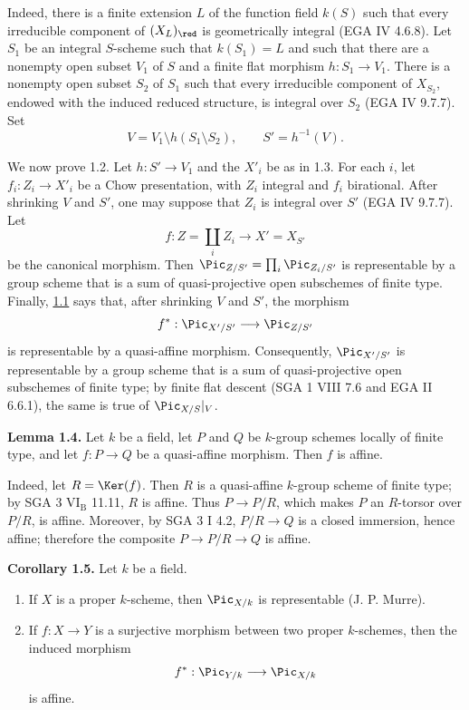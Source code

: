 Indeed, there is a finite extension $L$ of the function field $k(S)$ such
that every irreducible component of $(X_L)_{\red}$ is geometrically integral
(EGA IV 4.6.8). Let $S_1$ be an integral $S$-scheme such that $k(S_1)=L$ and
such that there are a nonempty open subset $V_1$ of $S$ and a finite flat
morphism $h:S_1\to V_1$. There is a nonempty open subset $S_2$ of $S_1$ such
that every irreducible component of $X_{S_2}$, endowed with the induced
reduced structure, is integral over $S_2$ (EGA IV 9.7.7). Set
\[
  V=V_1\setminus h(S_1\setminus S_2),\qquad S'=h^{-1}(V).
\]

We now prove 1.2. Let $h:S'\to V_1$ and the $X'_i$ be as in 1.3. For each
$i$, let $f_i:Z_i\to X'_i$ be a Chow presentation, with $Z_i$ integral and
$f_i$ birational. After shrinking $V$ and $S'$, one may suppose that $Z_i$
is integral over $S'$ (EGA IV 9.7.7). Let
\[
  f:Z=\coprod_i Z_i\longrightarrow X'=X_{S'}
\]
be the canonical morphism. Then
$\Pic_{Z/S'}=\prod_i\Pic_{Z_i/S'}$ is representable by a group scheme that is
a sum of quasi-projective open subschemes of finite type. Finally, \hyperlink{sga6.e12.thm.1-1}{1.1} says
that, after shrinking $V$ and $S'$, the morphism
\[
  f^*:\Pic_{X'/S'}\longrightarrow\Pic_{Z/S'}
\]
is representable by a quasi-affine morphism. Consequently,
$\Pic_{X'/S'}$ is representable by a group scheme that is a sum of
quasi-projective open subschemes of finite type; by finite flat descent
(SGA 1 VIII 7.6 and EGA II 6.6.1), the same is true of
$\Pic_{X/S}|_V$.

\textbf{Lemma 1.4.} Let $k$ be a field, let $P$ and $Q$ be $k$-group schemes
locally of finite type, and let $f:P\to Q$ be a quasi-affine morphism. Then
$f$ is affine.

Indeed, let $R=\Ker(f)$. Then $R$ is a quasi-affine $k$-group scheme of
finite type; by SGA 3 $\mathrm{VI}_{\mathrm B}$ 11.11, $R$ is affine.
Thus $P\to P/R$, which makes $P$ an $R$-torsor over $P/R$, is affine.
Moreover, by SGA 3 I 4.2, $P/R\to Q$ is a closed immersion, hence affine;
therefore the composite $P\to P/R\to Q$ is affine.

\textbf{Corollary 1.5.} Let $k$ be a field.
\begin{enumerate}[label=\alph*)]
\item If $X$ is a proper $k$-scheme, then $\Pic_{X/k}$ is representable
  (J. P. Murre).
\item If $f:X\to Y$ is a surjective morphism between two proper $k$-schemes,
  then the induced morphism
  \[
    f^*:\Pic_{Y/k}\longrightarrow\Pic_{X/k}
  \]
  is affine.
\end{enumerate}

